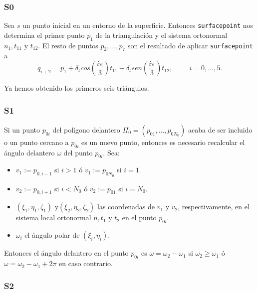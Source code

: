 \subsubsection{S0}

Sea $s$ un punto inicial en un entorno de la superficie. Entonces \texttt{surfacepoint} nos determina el primer punto $p_1$ de la triangulación y el sistema ortonormal $n_1, t_{11} \text{ y } t_{12}$. El resto de puntos $p_2, \dotso, p_7$ son el resultado de aplicar \texttt{surfacepoint} a
$$q_{i+2} = p_1 + \delta_t cos\left(\frac{i \pi}{3}\right)t_{11} + \delta_t sen\left(\frac{i\pi}{3}\right)t_{12}, \hspace{1cm} i = 0, \dotso, 5.$$

Ya hemos obtenido los primeros seis triángulos.

\subsubsection{S1}

Si un punto $p_{0i}$ del polígono delantero $\Pi_0 = (p_{01}, \dotso, p_{0N_0})$ acaba de ser incluido o un punto cercano a $p_{0i}$ es un nuevo punto, entonces es necesario recalcular el ángulo delantero $\omega$ del punto $p_{0i}$. Sea:
\begin{itemize}
	\item $v_1 := p_{0,i-1}$ si $i>1$ ó $v_1 := p_{0N_0}$ si $i=1$.
	\item $v_2 := p_{0,i+1}$ si $i<N_0$ ó $v_2 := p_{01}$ si $i=N_0$.
	\item $(\xi_1,\eta_1,\zeta_1)$ y$(\xi_2,\eta_2,\zeta_2)$ las coordenadas de $v_1$ y $v_2$, respectivamente, en el sistema local ortonormal $n, t_1$ y $t_2$ en el punto $p_{0i}$.
	\item $\omega_i$ el ángulo polar de $(\xi_i, \eta_i)$. 
\end{itemize}
Entonces el ángulo delantero en el punto $p_{0i}$ es $\omega = \omega_2 - \omega_1$ si $\omega_2 \geq \omega_1$ ó $\omega = \omega_2 - \omega_1 + 2\pi$ en caso contrario.

\subsubsection{S2}

